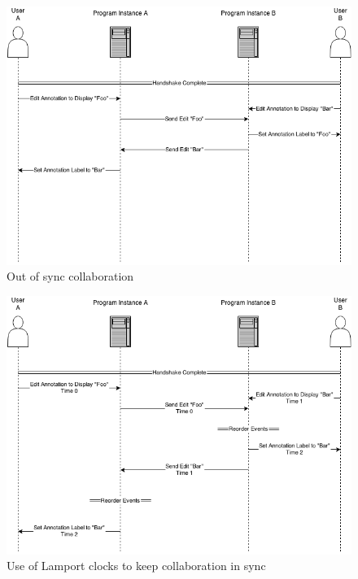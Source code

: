 \begin{figure}[h!]
    \centering
    \includegraphics[width=\textwidth]{images/minf_collab_mixup.png}
    \caption{Out of sync collaboration}
    \label{fig:collab_mixup}
\end{figure}

\begin{figure}[h!]
    \centering
    \includegraphics[width=\textwidth]{images/minf_collab_mixup_fix.png}
    \caption{Use of Lamport clocks to keep collaboration in sync}
    \label{fig:collab_mixup_fix}
\end{figure}

